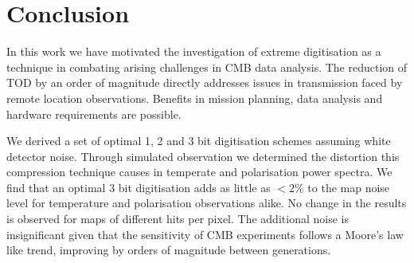 \documentclass[apj]{emulateapj}
\begin{document}

\section{Conclusion}
\label{sec:conclusions}

In this work we have motivated the investigation of extreme digitisation as a technique in combating arising challenges in CMB data analysis. The reduction of TOD by an order of magnitude directly addresses issues in transmission faced by remote location observations. Benefits in mission planning, data analysis and hardware requirements are possible.

We derived a set of optimal 1, 2 and 3 bit digitisation schemes assuming white detector noise. Through simulated observation we determined the distortion this compression technique causes in temperate and polarisation power spectra. We find that an optimal 3 bit digitisation adds as little as $<2\%$ to the map noise level for temperature and polarisation observations alike. No change in the results is observed for maps of different hits per pixel. The additional noise is insignificant given that the sensitivity of CMB experiments follows a Moore's law like trend, improving by orders of magnitude between generations. %
\end{document}
